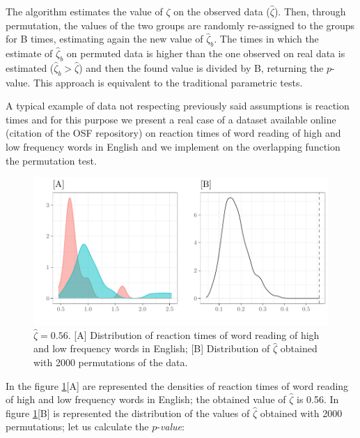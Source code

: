 \documentclass[10pt]{article}\usepackage[]{graphicx}\usepackage[]{xcolor}
\makeatletter
\def\maxwidth{ %
  \ifdim\Gin@nat@width>\linewidth
    \linewidth
  \else
    \Gin@nat@width
  \fi
}
\newenvironment{knitrout}{}{} %
\makeatother
\begin{document}
The algorithm estimates the value of $\zeta$ on the observed data ($\hat{\zeta}$). Then, through permutation, the values of the two groups are randomly re-assigned to the groups for B times, estimating again the new value of  $\hat{\zeta}_b$. The times in which the estimate of $\hat{\zeta}_b$ on permuted data is higher than the one observed on real data is estimated ($\hat{\zeta}_b > \hat{\zeta}$) and then the found value is divided by B, returning the $p$-value. This approach is equivalent to the traditional parametric tests.

A typical example of data not respecting previously said assumptions is reaction times and for this purpose we present a real case of a dataset available online (citation of the OSF repository) on reaction times of word reading of high and low frequency words in English and we implement on the overlapping function the permutation test. 










\begin{knitrout}
\color{fgcolor}\begin{figure}

{\centering \includegraphics[width=\maxwidth]{figure/ex2-1} 

}

\caption{$\hat{\zeta} = 0.56$. [A] Distribution of reaction times of word reading of high and low frequency words in English; [B] Distribution of $\hat{\zeta}$ obtained with 2000 permutations of the data.}\label{fig:ex2}
\end{figure}

\end{knitrout}
In the figure \ref{fig:ex2}[A] are represented the densities of reaction times of word reading of high and low frequency words in English; the obtained value of $\hat{\zeta}$ is 0.56. In figure \ref{fig:ex2}[B] is represented the distribution of the values of $\hat{\zeta}$ obtained with 2000 permutations; let us calculate the $p$-\emph{value}:
\end{document}
